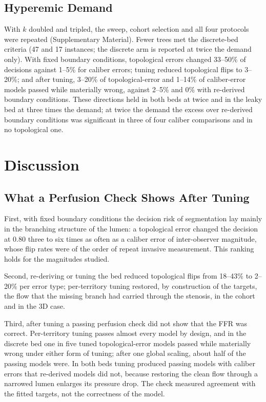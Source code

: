 \documentclass[journal,twoside,web]{ieeecolor}
\begin{document}
\subsection{Hyperemic Demand}\label{sec:demand}
With $k$ doubled and tripled, the sweep, cohort selection and all four protocols were repeated (Supplementary
Material). Fewer trees met the discrete-bed
criteria (47 and 17 instances; the discrete arm is reported at twice the demand only).
With fixed boundary conditions, topological errors changed 33--50\% of decisions against 1--5\% for caliber errors;
tuning reduced topological flips to 3--20\%; and after tuning, 3--20\% of topological-error and 1--14\% of
caliber-error models passed while materially wrong, against 2--5\% and 0\% with re-derived boundary conditions. These
directions held in both beds at twice and in the leaky bed at three times the demand; at twice the demand the
excess over re-derived boundary conditions was significant in three of four caliber comparisons and in no
topological one.

\section{Discussion}
\subsection{What a Perfusion Check Shows After Tuning}
First, with fixed boundary conditions the decision risk of segmentation lay mainly in the branching
structure of the lumen: a topological error changed the decision at 0.80 three to six times as often as a caliber
error of inter-observer magnitude, whose flip rates were of the order of repeat invasive measurement. This ranking
holds for the magnitudes studied.

Second, re-deriving or tuning the bed reduced topological flips from 18--43\% to 2--20\% per error type; per-territory
tuning restored, by construction of the targets, the flow that the missing branch had carried through the stenosis, in the cohort and in the 3D case.

Third, after tuning a passing perfusion check did not show that the FFR was correct. Per-territory tuning passes
almost every model by design, and in the discrete bed one in five tuned topological-error models passed while
materially wrong under either form of tuning; after one global scaling, about half of the passing models were. In both beds tuning produced passing models with
caliber errors that re-derived models did not, because restoring the clean flow through a narrowed lumen enlarges
its pressure drop. The check measured agreement with the fitted targets, not the correctness of the model.
\end{document}

